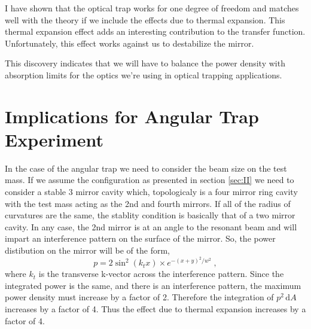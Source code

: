 \acresetall

I have shown that the optical trap works for one degree of freedom and
matches well with the theory if we include the effects due to thermal
expansion.
This thermal expansion effect adds an interesting contribution to the transfer
function. Unfortunately, this effect works against us to destabilize the mirror.

This discovery indicates that we will have to balance the power density with
absorption limits for the optics we're using in optical trapping
applications.

\section{Implications for Angular Trap Experiment}
In the case of the angular trap we need to consider the beam size on the
test mass.
If we assume the configuration as presented in section \ref{sec:II} we
need to consider a stable 3 mirror cavity which, topologicaly is a four
mirror ring cavity with the test mass acting as the 2nd and fourth mirrors.
If all of the radius of curvatures are the same, the stablity condition is
basically that of a two mirror cavity.
In any case, the 2nd mirror is at an angle to the resonant beam and will
impart an interference pattern on the surface of the mirror.
So, the power distibution on the mirror will be of the form,
\begin{equation}
p = 2 \sin^2(k_t x) \times e^{-(x+y)^2/w^2 } \;,
\end{equation}
where $k_t$ is the transverse k-vector across the interference pattern.
Since the integrated power is the same, and there is an interference pattern,
the maximum power density must increase by a factor of 2.
Therefore the integration of $p^2 \, \mathrm{d}A$ increases by a factor of 4.
Thus the effect due to thermal expansion increases by a factor of 4.


